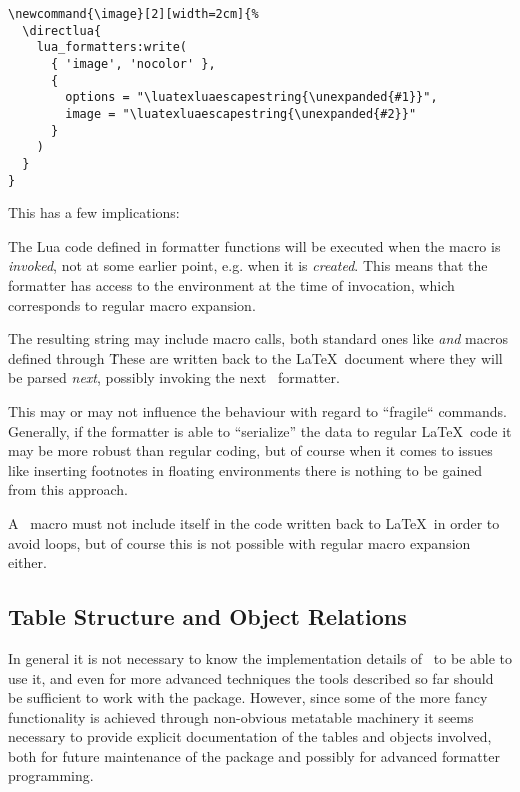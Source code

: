 \documentclass[12pt]{scrartcl}
\begin{document}
\begin{verbatim}
\newcommand{\image}[2][width=2cm]{%
  \directlua{
    lua_formatters:write(
      { 'image', 'nocolor' },
      {
        options = "\luatexluaescapestring{\unexpanded{#1}}",
        image = "\luatexluaescapestring{\unexpanded{#2}}"
      }
    )
  }
}
\end{verbatim}

\noindent This has a few implications:

\begin{itemize*}
\item The Lua code defined in formatter functions will be executed when the
macro is \emph{invoked}, not at some earlier point, e.g. when it is
\emph{created}.  This means that the formatter has access to the environment at
the time of invocation, which corresponds to regular macro expansion.
\item The resulting string may include macro calls, both standard ones like
 \emph{and} macros defined through \luaformatters\.  These are
written back to the \LaTeX\ document where they will be parsed \emph{next},
possibly invoking the next \luaformatters\ formatter.
\item This may or may not influence the behaviour with regard to “fragile“
commands.  Generally, if the formatter is able to “serialize” the data to
regular \LaTeX\ code it may be more robust than regular coding, but of course
when it comes to issues like inserting footnotes in floating environments there
is nothing to be gained from this approach.
\item A \luaformatters\ macro must not include itself in the code
written back to \LaTeX\ in order to avoid loops, but of course this is not
possible with regular macro expansion either.
\end{itemize*}


\subsection{Table Structure and Object Relations}
\label{sec:advanced:tables-and-objects}

In general it is not necessary to know the implementation details of
\luaformatters\ to be able to use it, and even for more advanced
techniques the tools described so far should be sufficient to work with the
package.  However, since some of the more fancy functionality is achieved
through non-obvious metatable machinery it seems necessary to provide explicit
documentation of the tables and objects involved, both for future maintenance of
the package and possibly for advanced formatter programming.
\end{document}
